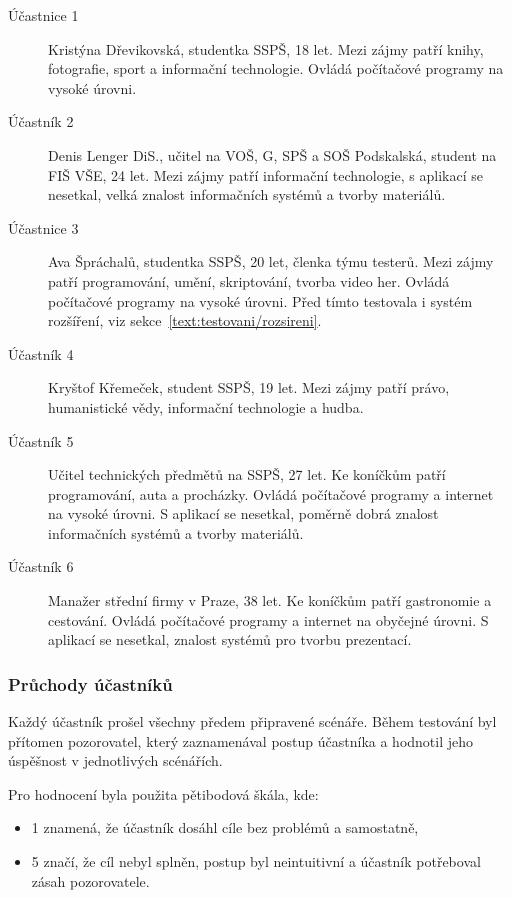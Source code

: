 \begin{description}
\item[Účastnice 1] Kristýna Dřevikovská, studentka SSPŠ, 18 let. Mezi zájmy patří knihy, fotografie, sport a informační technologie. Ovládá počítačové programy na vysoké úrovni.
\item[Účastník 2] Denis Lenger DiS., učitel na VOŠ, G, SPŠ a SOŠ Podskalská, student na FIŠ VŠE, 24 let. Mezi zájmy patří informační technologie, s aplikací se nesetkal, velká znalost informačních systémů a tvorby materiálů.
\item[Účastnice 3] Ava Špráchalů, studentka SSPŠ, 20 let, členka týmu testerů. Mezi zájmy patří programování, umění, skriptování, tvorba video her. Ovládá počítačové programy na vysoké úrovni. Před tímto testovala i systém rozšíření, viz sekce~\ref{text:testovani/rozsireni}.
\item[Účastník 4] Kryštof Křemeček, student SSPŠ, 19 let. Mezi zájmy patří právo, humanistické vědy, informační technologie a hudba.
\item[Účastník 5] Učitel technických předmětů na SSPŠ, 27 let. Ke koníčkům patří programování, auta a procházky. Ovládá počítačové programy a internet na vysoké úrovni. S aplikací se nesetkal, poměrně dobrá znalost informačních systémů a tvorby materiálů.
\item[Účastník 6] Manažer střední firmy v Praze, 38 let. Ke koníčkům patří gastronomie a cestování. Ovládá počítačové programy a internet na obyčejné úrovni. S aplikací se nesetkal, znalost systémů pro tvorbu prezentací.
\end{description}

\subsubsection{Průchody účastníků}

Každý účastník prošel všechny předem připravené scénáře.
Během testování byl přítomen pozorovatel, který zaznamenával postup účastníka a hodnotil jeho úspěšnost v jednotlivých scénářích. 

Pro hodnocení byla použita pětibodová škála, kde:

\begin{itemize}
      \item 1 znamená, že účastník dosáhl cíle bez problémů a samostatně,
      \item 5 značí, že cíl nebyl splněn, postup byl neintuitivní a účastník potřeboval zásah pozorovatele.
\end{itemize}

